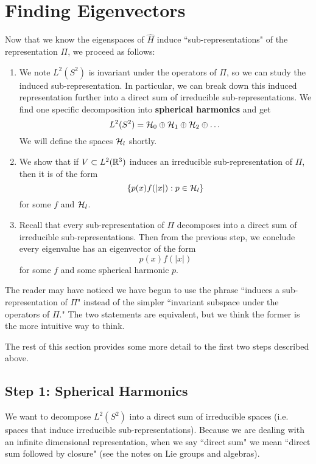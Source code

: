 \section{Finding Eigenvectors}
Now that we know the eigenspaces of $\hat{H}$ induce ``sub-representations" of the representation $\Pi$, we proceed as follows:
\begin{enumerate}
    \item We note $L^2(S^2)$ is invariant under the operators of $\Pi$, so we can study the induced sub-representation. In particular, we can break down this induced representation further into a direct sum of irreducible sub-representations. We find one specific decomposition into \textbf{spherical harmonics} and get
        \[
            L^2(S^2) = {\mathcal H}_0 \oplus {\mathcal H}_1 \oplus {\mathcal H}_2 \oplus \dots
        \]
        We will define the spaces ${\mathcal H}_l$ shortly.

    \item We show that if $V \subset L^2({\mathbb R}^3)$ induces an irreducible sub-representation of $\Pi$, then it is of the form
        \[
            \{p(x)f(|x|): p \in {\mathcal H}_l\}
        \]
        for some $f$ and ${\mathcal H}_l$.

    \item Recall that every sub-representation of $\Pi$ decomposes into a direct sum of irreducible sub-representations. Then from the previous step, we conclude every eigenvalue has an eigenvector of the form
        \[
            p(x)f(|x|)
        \]
        for some $f$ and some spherical harmonic $p$.
\end{enumerate}
The reader may have noticed we have begun to use the phrase ``induces a sub-representation of $\Pi$" instead of the simpler ``invariant subspace under the operators of $\Pi$." The two statements are equivalent, but we think the former is the more intuitive way to think.

The rest of this section provides some more detail to the first two steps described above.

\subsection{Step 1: Spherical Harmonics}
We want to decompose $L^2(S^2)$ into a direct sum of irreducible spaces (i.e. spaces that induce irreducible sub-representations). Because we are dealing with an infinite dimensional representation, when we say ``direct sum" we mean ``direct sum followed by closure" (see the notes on Lie groups and algebras).

